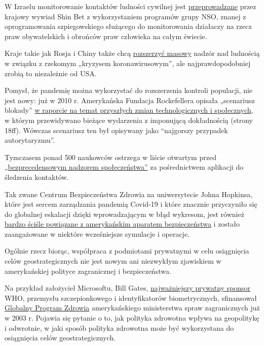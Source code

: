 W Izraelu monitorowanie kontaktów ludności cywilnej jest
\href{https://www.techdirt.com/articles/20200402/14261944226/controversial-spyware-vendor-nso-group-is-helping-israeli-government-spy-own-citizens.shtml}{przeprowadzane}
przez krajowy wywiad Shin Bet z wykorzystaniem programów grupy NSO,
znanej z oprogramowania szpiegowskiego służącego do monitorowania
działaczy na rzecz praw obywatelskich i obrońców praw człowieka na całym
świecie.

Kraje takie jak Rosja i Chiny także chcą
\href{https://www.npr.org/sections/coronavirus-live-updates/2020/04/01/825329399/moscow-launches-new-surveillance-app-to-track-residents-in-coronavirus-lockdown}{rozszerzyć
masowy} nadzór nad ludnością w związku z rzekomym „kryzysem
koronawirusowym'', ale najprawdopodobniej zrobią to niezależnie od USA.

Pomysł, że pandemię można wykorzystać do rozszerzenia kontroli
populacji, nie jest nowy: już w 2010 r. Amerykańska Fundacja
Rockefellera opisała „scenariusz blokady''
\href{https://swprs.files.wordpress.com/2020/04/rockefeller-foundation-scenarios-2010.pdf}{w
raporcie na temat przyszłych zmian technologicznych i społecznych}, w
którym przewidywano bieżące wydarzenia z imponującą dokładnością (strony
18ff). Wówczas scenariusz ten był opisywany jako ``najgorszy przypadek
autorytaryzmu''.

Tymczasem ponad 500 naukowców ostrzega w liście otwartym przed
\href{https://www.esat.kuleuven.be/cosic/sites/contact-tracing-joint-statement/}{„bezprecedensowym
nadzorem społeczeństwa''} za pośrednictwem aplikacji do śledzenia
kontaktów.

Tak zwane Centrum Bezpieczeństwa Zdrowia na uniwersytecie Johna
Hopkinsa, które jest sercem zarządzania pandemią Covid-19 i które
znacznie przyczyniło się do globalnej eskalacji dzięki wprowadzającym w
błąd wykresom, jest również
\href{https://www.thelastamericanvagabond.com/top-news/all-roads-lead-dark-winter/}{bardzo
ściśle powiązane z amerykańskim aparatem bezpieczeństwa} i zostało
zaangażowane w niektóre wcześniejsze symulacje i operacje.

Ogólnie rzecz biorąc, współpraca z podmiotami prywatnymi w celu
osiągnięcia celów geostrategicznych nie jest nowym ani niezwykłym
zjawiskiem w amerykańskiej polityce zagranicznej i bezpieczeństwa.

Na przykład założyciel Microsoftu, Bill Gates,
\href{https://www.youtube.com/watch?v=wQSYdAX_9JY}{najważniejszy
prywatny sponsor} WHO, przemysłu szczepionkowego i identyfikatorów
biometrycznych, sfinansował
\href{https://www.cfr.org/news-releases/council-establishes-senior-fellowship-global-health-and-foreign-policy-grant-bill}{Globalny
Program Zdrowia} amerykańskiego ministerstwa spraw zagranicznych już w
2003 r. Pojawia się pytanie o to, jak polityka zdrowotna wpływa na
geopolitykę i odwrotnie, w jaki sposób polityka zdrowotna może być
wykorzystana do osiągnięcia celów geostrategicznych.

